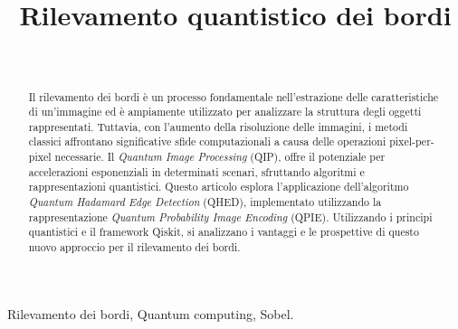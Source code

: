 \documentclass[journal]{IEEEtran}
\begin{document}
\title{Rilevamento quantistico dei bordi}

\author{
\\

}

\maketitle

\begin{abstract}
	Il rilevamento dei bordi è un processo fondamentale nell'estrazione delle caratteristiche di un'immagine ed è ampiamente utilizzato per analizzare la struttura degli oggetti rappresentati. Tuttavia, con l'aumento della risoluzione delle immagini, i metodi classici affrontano significative sfide computazionali a causa delle operazioni pixel-per-pixel necessarie. Il \emph{Quantum Image Processing} (QIP), offre il potenziale per accelerazioni esponenziali in determinati scenari, sfruttando algoritmi e rappresentazioni quantistici. Questo articolo esplora l'applicazione dell'algoritmo \emph{Quantum Hadamard Edge Detection} (QHED), implementato utilizzando la rappresentazione \emph{Quantum Probability Image Encoding} (QPIE). Utilizzando i principi quantistici e il framework Qiskit, si analizzano i vantaggi e le prospettive di questo nuovo approccio per il rilevamento dei bordi.
\end{abstract}

\begin{IEEEkeywords}
Rilevamento dei bordi, Quantum computing, Sobel.
\end{IEEEkeywords}




% 
\end{document}
